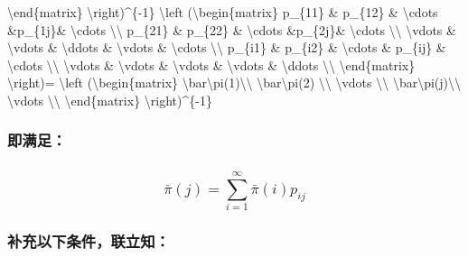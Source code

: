 \documentclass[11pt]{article}
\begin{document}
{{        \textbackslash{}end\{matrix\} \textbackslash{}right)\^{}\{-1\}
        \textbackslash{}left (\textbackslash{}begin\{matrix\}
        p\_\{11\} \& p\_\{12\} \& \textbackslash{}cdots \&p\_\{1j\}\& \textbackslash{}cdots  \textbackslash{}\textbackslash{}
        p\_\{21\}  \& p\_\{22\} \& \textbackslash{}cdots \&p\_\{2j\}\& \textbackslash{}cdots \textbackslash{}\textbackslash{}
        \textbackslash{}vdots \& \textbackslash{}vdots \& \textbackslash{}ddots \& \textbackslash{}vdots \& \textbackslash{}cdots \textbackslash{}\textbackslash{}
        p\_\{i1\} \& p\_\{i2\} \& \textbackslash{}cdots \& p\_\{ij\} \& \textbackslash{}cdots \textbackslash{}\textbackslash{}
        \textbackslash{}vdots \& \textbackslash{}vdots \& \textbackslash{}vdots \& \textbackslash{}vdots \& \textbackslash{}ddots \textbackslash{}\textbackslash{}
        \textbackslash{}end\{matrix\} \textbackslash{}right)=
         \textbackslash{}left (\textbackslash{}begin\{matrix\}
        \textbackslash{}bar\textbackslash{}pi(1)\textbackslash{}\textbackslash{} \textbackslash{}bar\textbackslash{}pi(2) \textbackslash{}\textbackslash{} \textbackslash{}vdots \textbackslash{}\textbackslash{} \textbackslash{}bar\textbackslash{}pi(j)\textbackslash{}\textbackslash{} \textbackslash{}vdots  \textbackslash{}\textbackslash{}
        \textbackslash{}end\{matrix\} \textbackslash{}right)\^{}\{-1\}
        }}\label{left-beginmatrix-barpi1-barpi2-vdots-barpij-vdots-endmatrix-right-1-left-beginmatrix-p_11-p_12-cdots-p_1j-cdots-p_21-p_22-cdots-p_2j-cdots-vdots-vdots-ddots-vdots-cdots-p_i1-p_i2-cdots-p_ij-cdots-vdots-vdots-vdots-vdots-ddots-endmatrix-right-left-beginmatrix-barpi1-barpi2-vdots-barpij-vdots-endmatrix-right-1}

\subsubsection{即满足：}\label{ux5373ux6ee1ux8db3}

\subsubsection{\texorpdfstring{\[\bar\pi(j)=\sum_{i=1}^{\infty} \bar\pi(i)p_{ij}\]}{\textbackslash{}bar\textbackslash{}pi(j)=\textbackslash{}sum\_\{i=1\}\^{}\{\textbackslash{}infty\} \textbackslash{}bar\textbackslash{}pi(i)p\_\{ij\}}}\label{barpijsum_i1infty-barpiip_ij}

\subsubsection{补充以下条件，联立知：}\label{ux8865ux5145ux4ee5ux4e0bux6761ux4ef6ux8054ux7acbux77e5}
\end{document}
